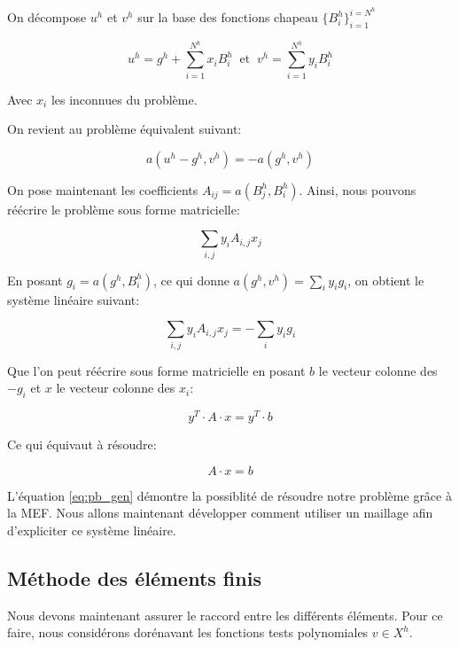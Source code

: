 \documentclass{article}
\begin{document}
On décompose $u^h$ et $v^h$ sur la base des fonctions chapeau
$\{B^h_i\}^{i=N^h}_{i=1}$

\begin{equation}
    u^h = g^h + \sum_{i=1}^{N^h} x_i B^h_i
    \ \text{ et } \ v^h = \sum_{i=1}^{N^h} y_i B^h_i
\end{equation}

Avec $x_i$ les inconnues du problème.

On revient au problème équivalent suivant:

\begin{equation}
    a(u^h - g^h, v^h) = - a(g^h, v^h)
\end{equation}

On pose maintenant les coefficients $A_{ij} = a(B^h_j, B^h_i)$. Ainsi, nous pouvons
réécrire le problème sous forme matricielle:

\begin{equation}
    \sum_{i,j} y_i A_{i,j} x_j
\end{equation}

En posant $g_i = a(g^h, B^h_i)$, ce qui donne $a(g^h, v^h) = \sum_i y_i g_i$,
on obtient le système linéaire suivant:

\begin{equation}
    \sum_{i,j} y_i A_{i,j} x_j = - \sum_i y_i g_i
\end{equation}

Que l'on peut réécrire sous forme matricielle en posant $b$ le vecteur colonne
des $-g_i$ et $x$ le vecteur colonne des $x_i$:

\begin{equation}
    y^T \cdot A \cdot x =  y^T \cdot b
\end{equation}

Ce qui équivaut à résoudre:

\begin{equation}
    \label{eq:pb_gen}
    A \cdot x = b
\end{equation}

L'équation \ref{eq:pb_gen} démontre la possiblité de résoudre notre
problème grâce à la MEF. Nous allons maintenant développer
comment utiliser un maillage afin d'expliciter ce système
linéaire.

\subsection{Méthode des éléments finis}

Nous devons maintenant assurer le raccord entre les différents éléments.
Pour ce faire, nous considérons dorénavant les fonctions tests
polynomiales $v \in X^h$.
\end{document}
